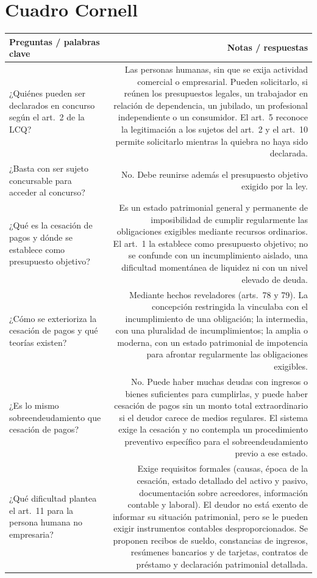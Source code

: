 \documentclass[12pt,oneside]{book}
\begin{document}
\section*{Cuadro Cornell}
\begin{longtable}{QR}
\toprule
Preguntas / palabras clave & \textbf{Notas / respuestas} \\
\midrule
\endhead
¿Quiénes pueden ser declarados en concurso según el art.\ 2 de la LCQ? &
Las personas humanas, sin que se exija actividad comercial o empresarial. Pueden solicitarlo, si reúnen los presupuestos legales, un trabajador en relación de dependencia, un jubilado, un profesional independiente o un consumidor. El art.\ 5 reconoce la legitimación a los sujetos del art.\ 2 y el art.\ 10 permite solicitarlo mientras la quiebra no haya sido declarada. \\[0.8em]
¿Basta con ser sujeto concursable para acceder al concurso? &
No. Debe reunirse además el presupuesto objetivo exigido por la ley. \\[0.8em]
¿Qué es la cesación de pagos y dónde se establece como presupuesto objetivo? &
Es un estado patrimonial general y permanente de imposibilidad de cumplir regularmente las obligaciones exigibles mediante recursos ordinarios. El art.\ 1 la establece como presupuesto objetivo; no se confunde con un incumplimiento aislado, una dificultad momentánea de liquidez ni con un nivel elevado de deuda. \\[0.8em]
¿Cómo se exterioriza la cesación de pagos y qué teorías existen? &
Mediante hechos reveladores (arts.\ 78 y 79). La concepción restringida la vinculaba con el incumplimiento de una obligación; la intermedia, con una pluralidad de incumplimientos; la amplia o moderna, con un estado patrimonial de impotencia para afrontar regularmente las obligaciones exigibles. \\[0.8em]
¿Es lo mismo sobreendeudamiento que cesación de pagos? &
No. Puede haber muchas deudas con ingresos o bienes suficientes para cumplirlas, y puede haber cesación de pagos sin un monto total extraordinario si el deudor carece de medios regulares. El sistema exige la cesación y no contempla un procedimiento preventivo específico para el sobreendeudamiento previo a ese estado. \\[0.8em]
¿Qué dificultad plantea el art.\ 11 para la persona humana no empresaria? &
Exige requisitos formales (causas, época de la cesación, estado detallado del activo y pasivo, documentación sobre acreedores, información contable y laboral). El deudor no está exento de informar su situación patrimonial, pero se le pueden exigir instrumentos contables desproporcionados. Se proponen recibos de sueldo, constancias de ingresos, resúmenes bancarios y de tarjetas, contratos de préstamo y declaración patrimonial detallada. \\[0.8em]

\end{longtable}
\end{document}
